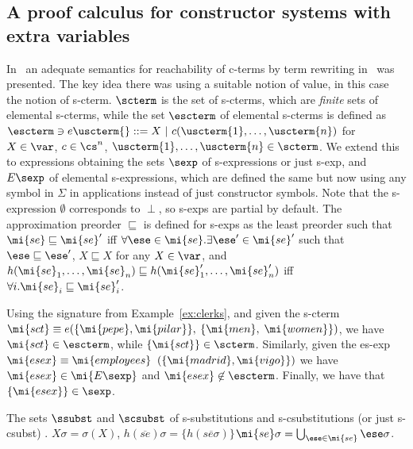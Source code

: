 \subsection{A proof calculus for constructor systems with extra variables}
In~\cite{Lopez-FraguasRS09-RTA09} an adequate semantics for reachability of c-terms by term rewriting in
\ctrss\ was presented. The key idea there was using a suitable notion of value, in this case
the notion of s-cterm.
$\scterm$ is the set of s-cterms, which are 
\emph{finite} sets of elemental s-cterms, while the set $\escterm$ of elemental s-cterms is defined as 
$\escterm \ni e\uscterm{} ::= X~|~c(\uscterm{1}, \ldots, \uscterm{n})$ for $X \in \var$, $c \in\cs^n$, 
$\uscterm{1}, \ldots, \uscterm{n} \in \scterm$. We extend this  to expressions obtaining 
the sets $\sexp$ of s-expressions or just s-exp, and $E\sexp$ of elemental s-expressions, which are defined 
the same but now using any symbol in $\Sigma$ in applications instead of just constructor symbols. Note 
that the s-expression $\emptyset$ corresponds to $\perp$, so s-exps are partial by default. The approximation
preorder $\sqsubseteq$ is defined for s-exps as the least preorder such that $\mi{se}\sqsubseteq \mi{se}'$
iff $\forall \ese\in \mi{se}.\exists \ese'\in \mi{se}'$ such that $\ese\sqsubseteq \ese'$, $X\sqsubseteq X$
for any $X\in\var$, and $h(\mi{se}_1, \ldots, \mi{se}_n)\sqsubseteq h(\mi{se}'_1, \ldots, \mi{se}'_n)$ 
iff $\forall i. \mi{se}_i\sqsubseteq \mi{se}'_i$.


\begin{example}
Using the signature from Example~\ref{ex:clerks}, and given the s-cterm
$\mi{sct} \equiv e(\{\mi{pepe}, \mi{pilar}\},$ $\{\mi{men},$ $\mi{women}\})$,
we have $\mi{sct} \in \escterm$, while $\{\mi{sct}\} \in \scterm$.
Similarly, given the es-exp
$\mi{esex} \equiv \mi{employees}$ $(\{\mi{madrid}, \mi{vigo}\})$ we have $\mi{esex} \in \mi{E\sexp}$
and $\mi{esex} \not\in \escterm$. Finally, we have that $\{\mi{esex}\} \in \sexp$.
\end{example}

The sets $\ssubst$ and $\scsubst$ of s-substitutions and s-csubstitutions (or just s-csubst) .  
$X\sigma = \sigma(X)$, $h(\overline{se})\sigma  =  \{h(\overline{se\sigma})\}$\shorttxt{, }$\mi{se}\sigma =  \bigcup_{\ese \in \mi{se}} \ese\sigma$. 
 
